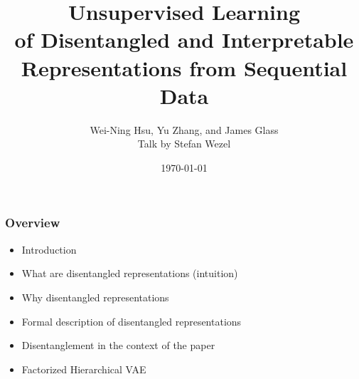 \documentclass[9pt]{beamer}
\title{Unsupervised Learning \\
	of Disentangled and Interpretable Representations from Sequential Data}
\author{Wei-Ning Hsu, Yu Zhang, and James Glass\\Talk by Stefan Wezel}
\institute{Explainable Machine Learning}
\date{\today}
\begin{document}
	

\begin{frame}[plain]
	\titlepage
\end{frame} 



\begin{frame}
\frametitle{Overview}
\begin{itemize}%
	\item Introduction
	\item What are disentangled representations (intuition)
	\item Why disentangled representations
	\item Formal description of disentangled representations
	\item Disentanglement in the context of the paper
	\item Factorized Hierarchical VAE
\end{itemize}
\end{frame} 
\end{document}
